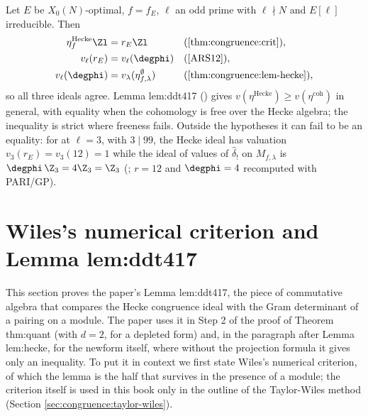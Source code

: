 \begin{remark}\label{rem:congruence:two-ideals}
Let $E$ be $X_0(N)$-optimal, $f=f_E$, $\ell$ an odd prime with $\ell\nmid N$ and $E[\ell]$ irreducible. Then
\begin{align*}
\eta^{\mathrm{Hecke}}_f\Zl&=r_E\Zl&&(\text{\Cref{thm:congruence:crit}}),\\
v_\ell(r_E)&=v_\ell(\degphi)&&(\text{\cite[Theorem 2.2]{ARS12}}),\\
v_\ell(\degphi)&=v_\lambda(\eta^\emptyset_{f,\lambda})&&(\text{\Cref{thm:congruence:lem-hecke}}),
\end{align*}
so all three ideals agree. Lemma lem:ddt417 () gives $v(\eta^{\mathrm{Hecke}})\ge v(\eta^{\mathrm{coh}})$ in general, with equality when the cohomology is free over the
Hecke algebra; the inequality is strict where freeness fails. Outside the hypotheses it can fail to be an equality: for  at $\ell=3$, with $3\mid99$, the
Hecke ideal has valuation $v_3(r_E)=v_3(12)=1$ while the ideal of values of $\hat\delta_!$ on $M_{f,\lambda}$ is $\degphi\,\Z_3=4\Z_3=\Z_3$ (; $r=12$ and $\degphi=4$
recomputed with PARI/GP).
\end{remark}

\section{Wiles's numerical criterion and Lemma lem:ddt417}\label{sec:congruence:ddt417}

This section proves the paper's Lemma lem:ddt417, the piece of commutative algebra that compares the Hecke congruence ideal with the Gram determinant
of a pairing on a module. The paper uses it in Step 2 of the proof of Theorem thm:quant (with $d=2$, for a depleted form) and, in the paragraph after Lemma lem:hecke,
for the newform itself, where without the projection formula it gives only an inequality. To put it in context we first state Wiles's numerical criterion, of which the lemma is the half that survives in the
presence of a module; the criterion itself is used in this book only in the outline of the Taylor-Wiles method (Section \ref{sec:congruence:taylor-wiles}).

